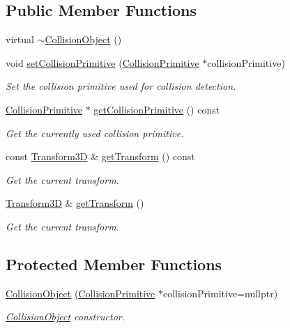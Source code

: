 \subsection*{Public Member Functions}
\begin{DoxyCompactItemize}
\item 
virtual \mbox{\hyperlink{classr3_1_1_collision_object_a26f7c8a9adb08718c98dce736cc89830}{$\sim$\+Collision\+Object}} ()
\item 
void \mbox{\hyperlink{classr3_1_1_collision_object_afaf76460298998bcbe405c0b2e6de6a6}{set\+Collision\+Primitive}} (\mbox{\hyperlink{classr3_1_1_collision_primitive}{Collision\+Primitive}} $\ast$collision\+Primitive)
\begin{DoxyCompactList}\small\item\em Set the collision primitive used for collision detection. \end{DoxyCompactList}\item 
\mbox{\hyperlink{classr3_1_1_collision_primitive}{Collision\+Primitive}} $\ast$ \mbox{\hyperlink{classr3_1_1_collision_object_aabb0d7173dacef5ffc02163557f55fa4}{get\+Collision\+Primitive}} () const
\begin{DoxyCompactList}\small\item\em Get the currently used collision primitive. \end{DoxyCompactList}\item 
const \mbox{\hyperlink{classr3_1_1_transform3_d}{Transform3D}} \& \mbox{\hyperlink{classr3_1_1_collision_object_a79e04809124cad6aeb25a66f11826fee}{get\+Transform}} () const
\begin{DoxyCompactList}\small\item\em Get the current transform. \end{DoxyCompactList}\item 
\mbox{\hyperlink{classr3_1_1_transform3_d}{Transform3D}} \& \mbox{\hyperlink{classr3_1_1_collision_object_acc41118b9a571e5aa918644aaeda6bfa}{get\+Transform}} ()
\begin{DoxyCompactList}\small\item\em Get the current transform. \end{DoxyCompactList}\end{DoxyCompactItemize}
\subsection*{Protected Member Functions}
\begin{DoxyCompactItemize}
\item 
\mbox{\hyperlink{classr3_1_1_collision_object_ad664d1dd3a03f183c46c6b7ba7327cfd}{Collision\+Object}} (\mbox{\hyperlink{classr3_1_1_collision_primitive}{Collision\+Primitive}} $\ast$collision\+Primitive=nullptr)
\begin{DoxyCompactList}\small\item\em \mbox{\hyperlink{classr3_1_1_collision_object}{Collision\+Object}} constructor. \end{DoxyCompactList}\end{DoxyCompactItemize}
